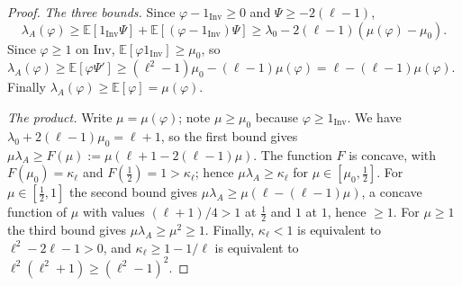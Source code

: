 \documentclass[11pt]{amsart}
\theoremstyle{definition}
\theoremstyle{remark}
\newcommand{\Inv}{\mathrm{Inv}}
\begin{document}
\begin{proof}
\emph{The three bounds.} Since $\varphi-1_{\Inv}\ge0$ and $\Psi\ge-2(\ell-1)$,
\[
  \lambda_A(\varphi)\ge\mathbb{E}[1_{\Inv}\Psi]+\mathbb{E}[(\varphi-1_{\Inv})\Psi]\ge\lambda_0-2(\ell-1)(\mu(\varphi)-\mu_0).
\]
Since $\varphi\ge1$ on $\Inv$, $\mathbb E[\varphi1_{\Inv}]\ge\mu_0$, so
$\lambda_A(\varphi)\ge\mathbb E[\varphi\Psi']\ge(\ell^2-1)\mu_0-(\ell-1)\mu(\varphi)=\ell-(\ell-1)\mu(\varphi)$.
Finally $\lambda_A(\varphi)\ge\mathbb E[\varphi]=\mu(\varphi)$.

\emph{The product.} Write $\mu=\mu(\varphi)$; note $\mu\ge\mu_0$ because $\varphi\ge1_{\Inv}$. We have
$\lambda_0+2(\ell-1)\mu_0=\ell+1$, so the first bound gives $\mu\lambda_A\ge F(\mu):=\mu(\ell+1-2(\ell-1)\mu)$. The
function $F$ is concave, with $F(\mu_0)=\kappa_\ell$ and $F(\tfrac12)=1>\kappa_\ell$; hence $\mu\lambda_A\ge\kappa_\ell$
for $\mu\in[\mu_0,\frac12]$. For $\mu\in[\frac12,1]$ the second bound gives $\mu\lambda_A\ge\mu(\ell-(\ell-1)\mu)$, a
concave function of $\mu$ with values $(\ell+1)/4>1$ at $\frac12$ and $1$ at $1$, hence $\ge1$. For $\mu\ge1$ the third
bound gives $\mu\lambda_A\ge\mu^2\ge1$. Finally, $\kappa_\ell<1$ is equivalent to $\ell^2-2\ell-1>0$, and
$\kappa_\ell\ge1-1/\ell$ is equivalent to $\ell^2(\ell^2+1)\ge(\ell^2-1)^2$.
\end{proof}
\end{document}
